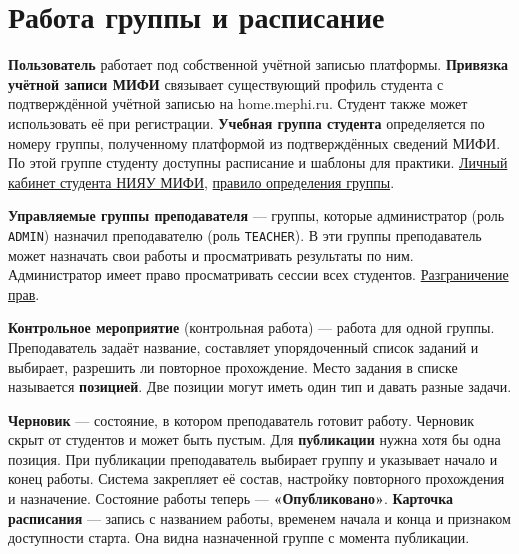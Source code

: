 \documentclass[12pt,a4paper]{article}
\begin{document}
\section{Работа группы и расписание}\label{ux440ux430ux431ux43eux442ux430-ux433ux440ux443ux43fux43fux44b-ux438-ux440ux430ux441ux43fux438ux441ux430ux43dux438ux435}

\hypertarget{работа-группы-и-расписание}{}

\textbf{Пользователь} работает под собственной учётной записью платформы. \textbf{Привязка учётной записи МИФИ} связывает существующий профиль студента с подтверждённой учётной записью на home.mephi.ru. Студент также может использовать её при регистрации. \textbf{Учебная группа студента} определяется по номеру группы, полученному платформой из подтверждённых сведений МИФИ. По этой группе студенту доступны расписание и шаблоны для практики. \href{https://mephi.ru/students/cab}{Личный кабинет студента НИЯУ МИФИ}, {\href{../02\_Техническое\_задание/DOC-02\_Техническое\_задание.pdf\#ts-req-func-group-join}{правило определения группы}}.

\textbf{Управляемые группы преподавателя} --- группы, которые администратор (роль \texttt{ADMIN}) назначил преподавателю (роль \texttt{TEACHER}). В эти группы преподаватель может назначать свои работы и просматривать результаты по ним. Администратор имеет право просматривать сессии всех студентов. {\href{../02\_Техническое\_задание/DOC-02\_Техническое\_задание.pdf\#ts-req-sec-roles}{Разграничение прав}}.

\textbf{Контрольное мероприятие} (контрольная работа) --- работа для одной группы. Преподаватель задаёт название, составляет упорядоченный список заданий и выбирает, разрешить ли повторное прохождение. Место задания в списке называется \textbf{позицией}. Две позиции могут иметь один тип и давать разные задачи.

\textbf{Черновик} --- состояние, в котором преподаватель готовит работу. Черновик скрыт от студентов и может быть пустым. Для \textbf{публикации} нужна хотя бы одна позиция. При публикации преподаватель выбирает группу и указывает начало и конец работы. Система закрепляет её состав, настройку повторного прохождения и назначение. Состояние работы теперь --- \textbf{«Опубликовано»}. \textbf{Карточка расписания} --- запись с названием работы, временем начала и конца и признаком доступности старта. Она видна назначенной группе с момента публикации.
\end{document}
